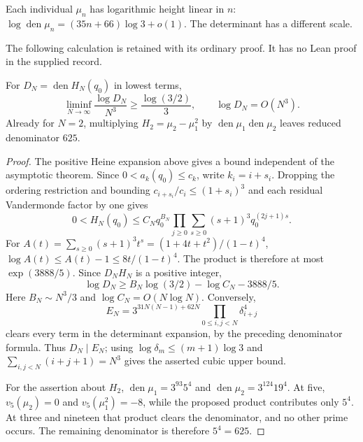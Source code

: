 Each individual $\mu_n$ has logarithmic height linear in $n$:
$\log\operatorname{den}\mu_n=(35n+66)\log3+o(1)$.
The determinant has a different scale.

The following calculation is retained with its ordinary proof. It has
no Lean proof in the supplied record.

\begin{remark}
\label{long1049:prop:calibrated-height}
For $D_N=\operatorname{den}H_N(q_0)$ in lowest terms,
\[
 \liminf_{N\to\infty}\frac{\log D_N}{N^3}
       \ge\frac{\log(3/2)}3,
 \qquad \log D_N=O(N^3).
\]
Already for $N=2$, multiplying $H_2=\mu_2-\mu_1^2$ by
$\operatorname{den}\mu_1\operatorname{den}\mu_2$ leaves reduced
denominator $625$.
\end{remark}

\begin{proof}
The positive Heine expansion above gives a bound independent of the
asymptotic theorem.  Since $0<a_k(q_0)\le c_k$, write $k_i=i+s_i$.
Dropping the ordering restriction and bounding
$c_{i+s_i}/c_i\le(1+s_i)^3$ and each residual Vandermonde factor by
one gives
\[
 0<H_N(q_0)\le C_Nq_0^{B_N}
   \prod_{j\ge0}\sum_{s\ge0}(s+1)^3q_0^{(2j+1)s}.
\]
For $A(t)=\sum_{s\ge0}(s+1)^3t^s=(1+4t+t^2)/(1-t)^4$,
$\log A(t)\le A(t)-1\le8t/(1-t)^4$.  The product is therefore at
most $\exp(3888/5)$.  Since $D_NH_N$ is a positive integer,
\[
 \log D_N\ge B_N\log(3/2)-\log C_N-3888/5.
\]
Here $B_N\sim N^3/3$ and $\log C_N=O(N\log N)$.
Conversely,
\[
 E_N=3^{31N(N-1)+62N}\prod_{0\le i,j<N}\delta_{i+j}^{4}
\]
clears every term in the determinant expansion, by the preceding
denominator formula.  Thus $D_N\mid E_N$; using
$\log\delta_m\le(m+1)\log3$ and
$\sum_{i,j<N}(i+j+1)=N^3$ gives the asserted cubic upper bound.

For the assertion about $H_2$,
$\operatorname{den}\mu_1=3^{93}5^4$ and
$\operatorname{den}\mu_2=3^{124}19^4$.
At five, $v_5(\mu_2)=0$ and $v_5(\mu_1^2)=-8$,
while the proposed product contributes only $5^4$.
At three and nineteen that product clears the denominator, and no
other prime occurs.  The remaining denominator is therefore $5^4=625$.
\end{proof}

